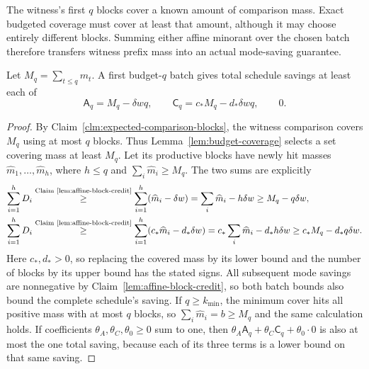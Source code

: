 The witness's first $q$ blocks cover a known amount of comparison
mass. Exact budgeted coverage must cover at least that amount,
although it may choose entirely different blocks. Summing either
affine minorant over the chosen batch therefore transfers witness
prefix mass into an actual mode-saving guarantee.
\begin{claim}
\label{clm:expected-first-batch-credit}
Let $M_q=\sum_{t\le q}m_t$. A first budget-$q$ batch gives total
schedule savings at least each of
\[
 \mathsf A_q=M_q-\delta wq,\qquad
 \mathsf C_q=c_*M_q-d_*\delta wq,\qquad 0.
\]
\end{claim}
\begin{proof}
By Claim~\ref{clm:expected-comparison-blocks}, the witness comparison
covers $M_q$ using at most $q$ blocks. Thus
Lemma~\ref{lem:budget-coverage} selects a set covering mass at least
$M_q$. Let its productive blocks have newly hit masses
$\widehat m_1,\ldots,\widehat m_h$, where $h\le q$ and
$\sum_i\widehat m_i\ge M_q$. The two sums are explicitly
\[
 \begin{aligned}
 \sum_{i=1}^hD_i
 &\byref{Claim}{lem:affine-block-credit}{\ge}\sum_{i=1}^h(\widehat m_i-\delta w)
   =\sum_i\widehat m_i-h\delta w
   \ge M_q-q\delta w,\\
 \sum_{i=1}^hD_i
 &\byref{Claim}{lem:affine-block-credit}{\ge}\sum_{i=1}^h(c_*\widehat m_i-d_*\delta w)
   =c_*\sum_i\widehat m_i-d_*h\delta w
   \ge c_*M_q-d_*q\delta w.
 \end{aligned}
\]
Here $c_*,d_*>0$, so replacing the covered mass by its lower bound
and the number of blocks by its upper bound has the stated signs.
All subsequent mode savings are nonnegative by
Claim~\ref{lem:affine-block-credit}, so both batch bounds also
bound the complete schedule's saving.
If $q\ge k_{\min}$, the minimum cover hits all positive
mass with at most $q$ blocks, so $\sum_i\widehat m_i=b\ge M_q$
and the same calculation holds. If coefficients
$\theta_A,\theta_C,\theta_0\ge0$ sum to one, then
$\theta_A\mathsf A_q+\theta_C\mathsf C_q+\theta_0\cdot0$
is also at most the one total saving, because each of its three
terms is a lower bound on that same saving.
\end{proof}

